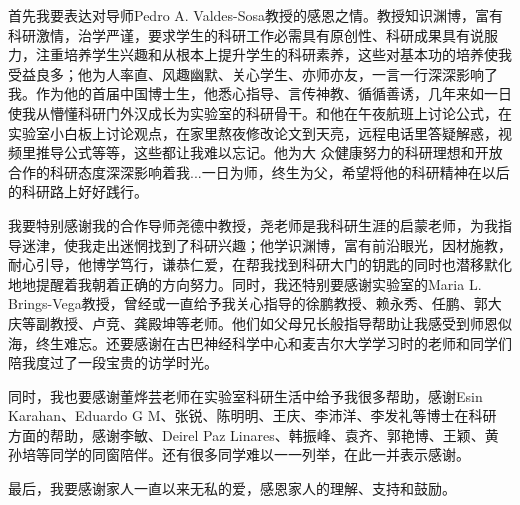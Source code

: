 \thesisacknowledgement
首先我要表达对导师Pedro A. Valdes-Sosa教授的感恩之情。教授知识渊博，富有科研激情，治学严谨，要求学生的科研工作必需具有原创性、科研成果具有说服力，注重培养学生兴趣和从根本上提升学生的科研素养，这些对基本功的培养使我受益良多；他为人率直、风趣幽默、关心学生、亦师亦友，一言一行深深影响了我。作为他的首届中国博士生，他悉心指导、言传神教、循循善诱，几年来如一日使我从懵懂科研门外汉成长为实验室的科研骨干。和他在午夜航班上讨论公式，在实验室小白板上讨论观点，在家里熬夜修改论文到天亮，远程电话里答疑解惑，视频里推导公式等等，这些都让我难以忘记。他为大
众健康努力的科研理想和开放合作的科研态度深深影响着我...一日为师，终生为父，希望将他的科研精神在以后的科研路上好好践行。

我要特别感谢我的合作导师尧德中教授，尧老师是我科研生涯的启蒙老师，为我指导迷津，使我走出迷惘找到了科研兴趣；他学识渊博，富有前沿眼光，因材施教，耐心引导，他博学笃行，谦恭仁爱，在帮我找到科研大门的钥匙的同时也潜移默化地地提醒着我朝着正确的方向努力。同时，我还特别要感谢实验室的Maria L. Brings-Vega教授，曾经或一直给予我关心指导的徐鹏教授、赖永秀、任鹏、郭大庆等副教授、卢竞、龚殿坤等老师。他们如父母兄长般指导帮助让我感受到师恩似海，终生难忘。还要感谢在古巴神经科学中心和麦吉尔大学学习时的老师和同学们陪我度过了一段宝贵的访学时光。

同时，我也要感谢董烨芸老师在实验室科研生活中给予我很多帮助，感谢Esin Karahan、Eduardo G M、张锐、陈明明、王庆、李沛洋、李发礼等博士在科研
方面的帮助，感谢李敏、Deirel Paz Linares、韩振峰、袁齐、郭艳博、王颖、黄孙培等同学的同窗陪伴。还有很多同学难以一一列举，在此一并表示感谢。

最后，我要感谢家人一直以来无私的爱，感恩家人的理解、支持和鼓励。